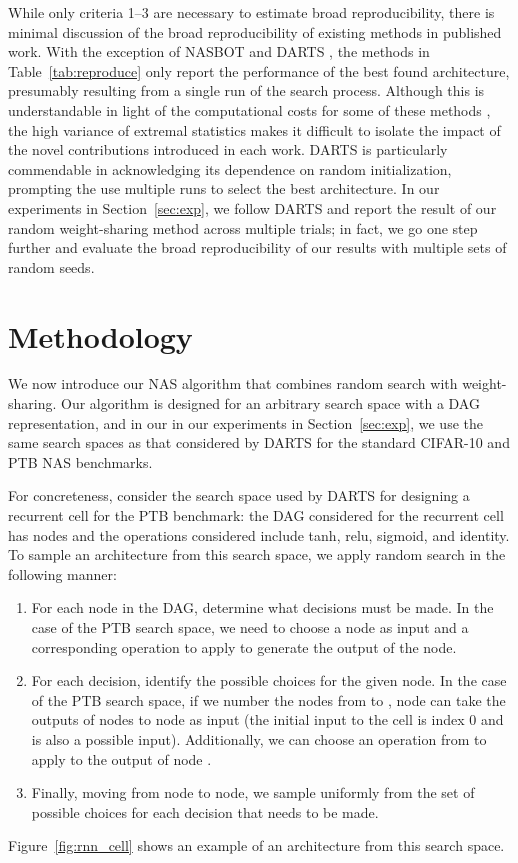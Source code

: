 \documentclass[acmlarge, nonacm]{acmart}
\begin{document}
While only criteria 1--3 are necessary to estimate broad reproducibility, there is minimal discussion of the broad reproducibility of existing methods in published work.  With the exception of NASBOT \citep{Kandasamy2018} and DARTS \citep{liu2018darts}, the methods in Table~\ref{tab:reproduce} only report the performance of the best found architecture, presumably resulting from a single run of the search process.  Although this is understandable in light of the computational costs for some of these methods \citep{Luo2018, cai2018path}, the high variance of extremal statistics makes it difficult to isolate the impact of the novel contributions introduced in each work.  DARTS is  particularly commendable in acknowledging its dependence on random initialization, prompting the use multiple runs to select the best architecture.  In our experiments in Section~\ref{sec:exp}, we follow DARTS and report the result of our random weight-sharing method across multiple trials; in fact,  we go one step further and evaluate the broad reproducibility of our results with multiple sets of random seeds.  


\section{Methodology}
\label{sec:alg}

We now introduce our NAS algorithm that combines random search with weight-sharing. Our algorithm is designed for an arbitrary search space with a DAG representation, and in our in our experiments in Section~\ref{sec:exp}, we use the same search spaces as that considered by DARTS \citep{liu2018darts} for the standard CIFAR-10 and PTB NAS benchmarks. 

For concreteness, consider the search space used by DARTS for designing a recurrent cell for the PTB benchmark: the DAG considered for the recurrent cell has  nodes and the operations considered include tanh, relu, sigmoid, and identity.
To sample an architecture from this search space, we apply random search in the following manner: 

\begin{enumerate}[leftmargin=*]
    \item For each node in the DAG, determine what decisions must be made.  In the case of the PTB search space, we need to choose a node as input and a corresponding operation to apply to generate the output of the node. 
    \item For each decision, identify the possible choices for the given node. In the case of the PTB search space, if we number the nodes from  to , node  can take the outputs of nodes  to node  as input (the initial input to the cell is index 0 and is also a possible input).   Additionally, we can choose an operation from  to apply to the output of node .  
    \item Finally, moving from node to node, we sample uniformly from the set of possible choices for each decision that needs to be made.
\end{enumerate}
Figure~\ref{fig:rnn_cell} shows an example of an architecture from this search space.
\end{document}
